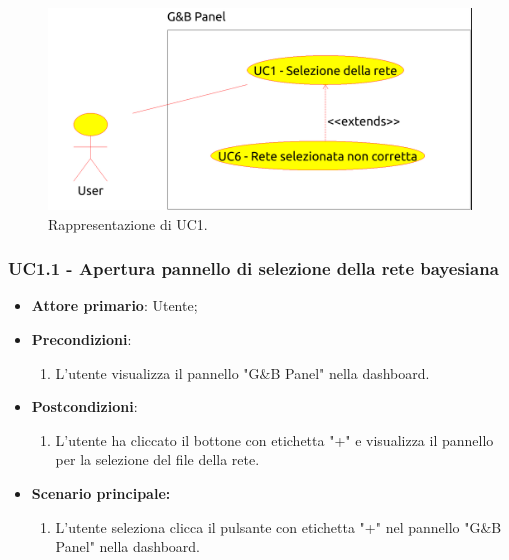 \begin{figure}[h!]
	\begin{center}
		\includegraphics[scale=0.6]{./images/UC1.png}
		 \caption{Rappresentazione di UC1.}	
	\end{center}
\end{figure}

	

\subsubsection{UC1.1 - Apertura pannello di selezione della rete bayesiana}\label{UC1.1}
\begin{itemize}
	\item \textbf{Attore primario}: Utente;
	\item \textbf{Precondizioni}:
	\begin{enumerate}
		\item L'utente visualizza il pannello "G\&B Panel" nella dashboard.
	\end{enumerate}
	\item \textbf{Postcondizioni}: 
	\begin{enumerate}
		\item L'utente ha cliccato il bottone con etichetta "+" e visualizza il pannello per la selezione del file della rete.
	\end{enumerate}
	\item \textbf{Scenario principale:}
	\begin{enumerate}
		\item L'utente seleziona clicca il pulsante con etichetta "+" nel pannello "G\&B Panel" nella dashboard.
	\end{enumerate}
\end{itemize}


